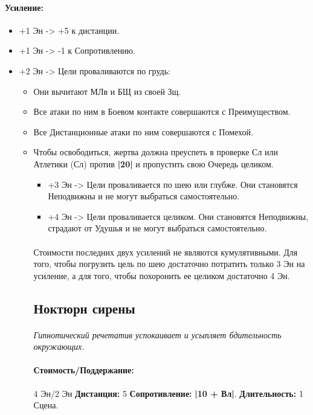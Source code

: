 \paragraph{Усиление:}
\begin{itemize}
\item+1 Эн -> +5 к дистанции.
\item+1 Эн -> -1 к Сопротивлению.
\item+2 Эн -> Цели проваливаются по грудь: 
\begin{itemize} 
\item Они вычитают МЛв и БЩ из своей Зщ. 
\item Все атаки по ним в Боевом контакте совершаются с Преимуществом. 
\item Все Дистанционные атаки по ним совершаются с Помехой. 
\item Чтобы освободиться, жертва должна преуспеть в проверке Сл или Атлетики (Сл) против 
\textbf{|20|} и пропустить свою Очередь целиком. 
\begin{itemize}
\item+3 Эн -> Цели проваливается по шею или глубже. Они становятся Неподвижны и не могут выбраться самостоятельно.
\item+4 Эн -> Цели проваливается целиком. Они становятся Неподвижны, страдают от Удушья и не могут выбраться самостоятельно.
\end{itemize}
\paragraph{}
\begin{tcolorbox} Стоимости последних двух усилений не являются кумулятивными. Для того, чтобы погрузить цель по шею достаточно потратить только 3 Эн на усиление, а для того, чтобы похоронить ее целиком достаточно 4 Эн. 
\end{tcolorbox}
\subsection{Ноктюрн сирены}
\paragraph{} 
\textit{Гипнотический речетатив успокаивает и усыпляет бдительность окружающих.}
\paragraph{Стоимость/Поддержание: }4 Эн/2 Эн
\newline
\textbf{Дистанция: }5
\newline
\textbf{Сопротивление: }
\textbf{|10 + Вл|}.
\newline 
\textbf{Длительность: }1 Сцена.

\end{itemize}
\end{itemize}
